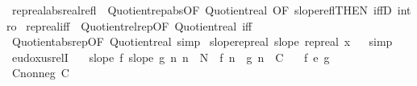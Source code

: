 \begin{isabellebody}
\isanewline
{}\isamarkupfalse%
\ rep{\isacharunderscore}{\kern0pt}real{\isacharunderscore}{\kern0pt}abs{\isacharunderscore}{\kern0pt}real{\isacharunderscore}{\kern0pt}refl\ {\isacharequal}{\kern0pt}\ Quotient{\isacharunderscore}{\kern0pt}rep{\isacharunderscore}{\kern0pt}abs{\isacharbrackleft}{\kern0pt}OF\ Quotient{\isacharunderscore}{\kern0pt}real{\isacharcomma}{\kern0pt}\ OF\ slope{\isacharunderscore}{\kern0pt}refl{\isacharbrackleft}{\kern0pt}THEN\ iffD{}{\isacharbrackright}{\kern0pt}{\isacharcomma}{\kern0pt}\ intro{\isacharbang}{\kern0pt}{\isacharbrackright}{\kern0pt}\isanewline
{}\isamarkupfalse%
\ rep{\isacharunderscore}{\kern0pt}real{\isacharunderscore}{\kern0pt}iff\ {\isacharequal}{\kern0pt}\ Quotient{\isacharunderscore}{\kern0pt}rel{\isacharunderscore}{\kern0pt}rep{\isacharbrackleft}{\kern0pt}OF\ Quotient{\isacharunderscore}{\kern0pt}real{\isacharcomma}{\kern0pt}\ iff{\isacharbrackright}{\kern0pt}\isanewline
\isanewline
{}\isamarkupfalse%
\ Quotient{\isacharunderscore}{\kern0pt}abs{\isacharunderscore}{\kern0pt}rep{\isacharbrackleft}{\kern0pt}OF\ Quotient{\isacharunderscore}{\kern0pt}real{\isacharcomma}{\kern0pt}\ simp{\isacharbrackright}{\kern0pt}\isanewline
\isanewline
{}\isamarkupfalse%
\ slope{\isacharunderscore}{\kern0pt}rep{\isacharunderscore}{\kern0pt}real{\isacharcolon}{\kern0pt}\ {\isachardoublequoteopen}slope\ {\isacharparenleft}{\kern0pt}rep{\isacharunderscore}{\kern0pt}real\ x{\isacharparenright}{\kern0pt}{\isachardoublequoteclose}%
\isadelimproof
\ %
\endisadelimproof
%
\isatagproof
{}\isamarkupfalse%
\ simp%
\endisatagproof
{\isafoldproof}%
%
\isadelimproof
%
\endisadelimproof
\isanewline
\isanewline
{}\isamarkupfalse%
\ eudoxus{\isacharunderscore}{\kern0pt}relI{\isacharcolon}{\kern0pt}\isanewline
\ \ \ {\isachardoublequoteopen}slope\ f{\isachardoublequoteclose}\ {\isachardoublequoteopen}slope\ g{\isachardoublequoteclose}\ {\isachardoublequoteopen}{\isasymAnd}n{\isachardot}{\kern0pt}\ n\ {\isasymge}\ N\ {\isasymLongrightarrow}\ {\isasymbar}f\ n\ {\isacharminus}{\kern0pt}\ g\ n{\isasymbar}\ {\isasymle}\ C{\isachardoublequoteclose}\isanewline
\ \ \ {\isachardoublequoteopen}f\ {\isasymsim}\isactrlsub e\ g{\isachardoublequoteclose}\isanewline
%
\isadelimproof
%
\endisadelimproof
%
\isatagproof
{}\isamarkupfalse%
\ {\isacharminus}{\kern0pt}\isanewline
\ \ \isamarkupfalse%
\ C{\isacharunderscore}{\kern0pt}nonneg{\isacharcolon}{\kern0pt}\ {\isachardoublequoteopen}C\ {\isasymge}\ {}{\isachardoublequoteclose}\ \isamarkupfalse%

\end{isabellebody}
